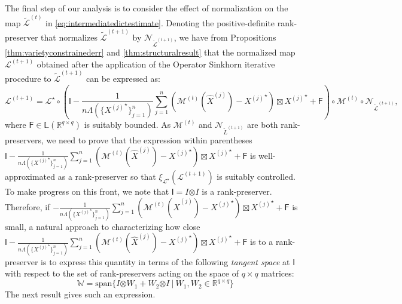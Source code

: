 \documentclass[11pt,letterpaper]{article}
\newcommand{\R}{\mathbb{R}}
\renewcommand{\L}{\mathcal{L}}
\newcommand{\botimes}{\boldsymbol \otimes}
\newcommand{\sff}{\mathsf{F}}
\newcommand{\sfi}{\mathsf{I}}
\newcommand{\coveig}{\Lambda}
\begin{document}
The final step of our analysis is to consider the effect of normalization on the map $\tilde{\L}^{(t)}$ in \eqref{eq:intermediatedictestimate}.  Denoting the positive-definite rank-preserver that normalizes $\tilde{\L}^{(t+1)}$ by $\mathcal{N}_{\tilde{\L}^{(t+1)}}$, we have from Propositions \ref{thm:varietyconstrainederr} and \ref{thm:structuralresult} that the normalized map $\L^{(t+1)}$ obtained after the application of the Operator Sinkhorn iterative procedure to $\tilde{\L}^{(t+1)}$ can be expressed as:
\begin{equation*}
\L^{(t+1)} = \L^\star \circ \left(\sfi - \frac{1}{n\coveig\!\left(\{{X^{(j)}}^\star\}_{j=1}^n\right)} \sum_{j=1}^{n} \left(\mathcal{M}^{(t)}(\hat{X}^{(j)}) - {X^{(j)}}^\star\right) \boxtimes {X^{(j)}}^\star + \sff \right) \circ \mathcal{M}^{(t)} \circ \mathcal{N}_{\tilde{\L}^{(t+1)}},
\end{equation*}
where $\sff \in \mathbb{L}(\R^{q\times q})$ is suitably bounded.  As $\mathcal{M}^{(t)}$ and $\mathcal{N}_{\tilde{L}^{(t+1)}}$ are both rank-preservers, we need to prove that the expression within parentheses $\sfi \allowbreak - \allowbreak \frac{1}{n\coveig\!\left(\{{X^{(j)}}^\star\}_{j=1}^n\right)} \allowbreak \sum_{j=1}^{n} \left(\mathcal{M}^{(t)}(\hat{X}^{(j)}) - {X^{(j)}}^\star\right) \boxtimes {X^{(j)}}^\star + \sff$ is well-approximated as a rank-preserver so that $\xi_{\L^\star}(\L^{(t+1)})$ is suitably controlled.  To make progress on this front, we note that $\sfi = I \botimes I$ is a rank-preserver. Therefore, if $- \allowbreak \frac{1}{n\coveig\!\left(\{{X^{(j)}}^\star\}_{j=1}^n\right)} \allowbreak \sum_{j=1}^{n} \left(\mathcal{M}^{(t)}(\hat{X}^{(j)}) - {X^{(j)}}^\star\right) \boxtimes {X^{(j)}}^\star + \sff$ is small, a natural approach to characterizing how close $\sfi \allowbreak - \allowbreak \frac{1}{n\coveig\!\left(\{{X^{(j)}}^\star\}_{j=1}^n\right)} \allowbreak \sum_{j=1}^{n} \left(\mathcal{M}^{(t)}(\hat{X}^{(j)}) - {X^{(j)}}^\star\right) \boxtimes {X^{(j)}}^\star + \sff$ is to a rank-preserver is to express this quantity in terms of the following \emph{tangent space} at $\sfi$ with respect to the set of rank-preservers acting on the space of $q \times q$ matrices:
\begin{equation} \label{eq:tangentspaceati}
\mathbb{W} = \mathrm{span}\{I \botimes W_1 + W_2 \botimes I ~|~ W_1, W_2 \in \R^{q \times q}\}
\end{equation}
The next result gives such an expression.
\end{document}

